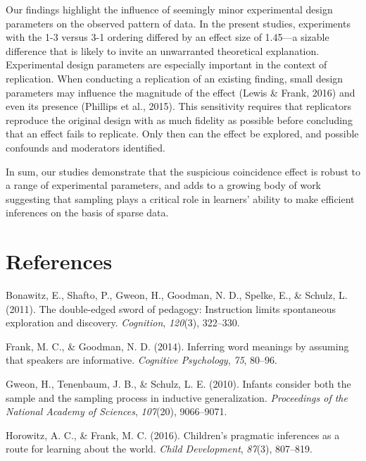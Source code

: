 \documentclass[english,floatsintext,man]{apa6}
\theoremstyle{definition}
\theoremstyle{definition}
\theoremstyle{remark}
\begin{document}
Our findings highlight the influence of seemingly minor experimental
design parameters on the observed pattern of data. In the present
studies, experiments with the 1-3 versus 3-1 ordering differed by an
effect size of 1.45---a sizable difference that is likely to invite an
unwarranted theoretical explanation. Experimental design parameters are
especially important in the context of replication. When conducting a
replication of an existing finding, small design parameters may
influence the magnitude of the effect (Lewis \& Frank, 2016) and even
its presence (Phillips et al., 2015). This sensitivity requires that
replicators reproduce the original design with as much fidelity as
possible before concluding that an effect fails to replicate. Only then
can the effect be explored, and possible confounds and moderators
identified.

In sum, our studies demonstrate that the suspicious coincidence effect
is robust to a range of experimental parameters, and adds to a growing
body of work suggesting that sampling plays a critical role in learners'
ability to make efficient inferences on the basis of sparse data.

\newpage

\section{References}\label{references}

\setlength{\parindent}{-0.5in} \setlength{\leftskip}{0.5in}

\hypertarget{refs}{}
\hypertarget{ref-bonawitz2011}{}
Bonawitz, E., Shafto, P., Gweon, H., Goodman, N. D., Spelke, E., \&
Schulz, L. (2011). The double-edged sword of pedagogy: Instruction
limits spontaneous exploration and discovery. \emph{Cognition},
\emph{120}(3), 322--330.

\hypertarget{ref-frank2014}{}
Frank, M. C., \& Goodman, N. D. (2014). Inferring word meanings by
assuming that speakers are informative. \emph{Cognitive Psychology},
\emph{75}, 80--96.

\hypertarget{ref-gweon2010}{}
Gweon, H., Tenenbaum, J. B., \& Schulz, L. E. (2010). Infants consider
both the sample and the sampling process in inductive generalization.
\emph{Proceedings of the National Academy of Sciences}, \emph{107}(20),
9066--9071.

\hypertarget{ref-horowitz2016}{}
Horowitz, A. C., \& Frank, M. C. (2016). Children's pragmatic inferences
as a route for learning about the world. \emph{Child Development},
\emph{87}(3), 807--819.
\end{document}
